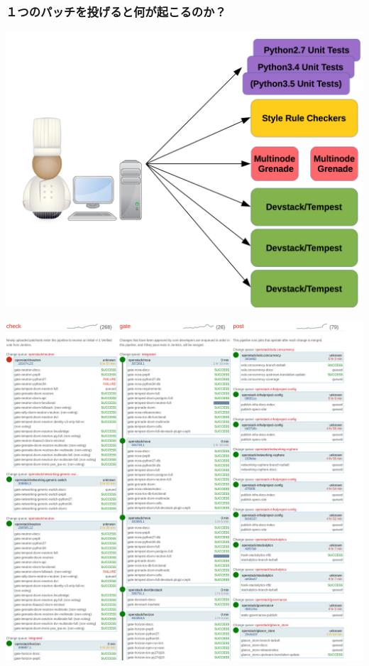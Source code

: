 \documentclass[aspectratio=169,11pt,hyperref={colorlinks=true}]{beamer}
\begin{document}
\begin{frame}
  \frametitle{１つのパッチを投げると何が起こるのか？}
  \begin{center}
    \includegraphics[width=.7\textwidth]{jobs.png}
  \end{center}
\end{frame}

\begin{frame}
  \begin{center}
      \includegraphics[width=.8\textwidth]{ZuulStatus.png}
  \end{center}
\end{frame}
\end{document}
